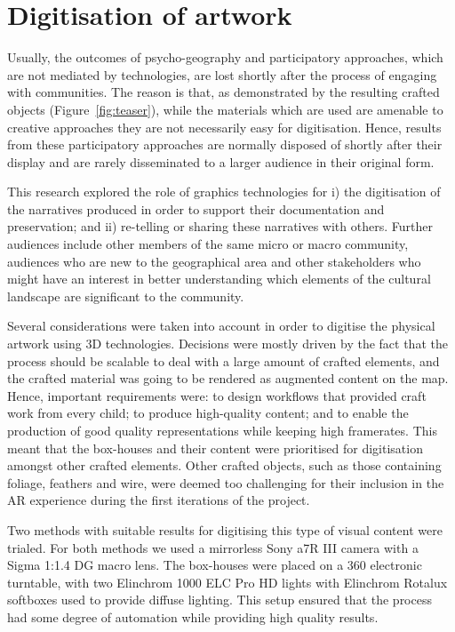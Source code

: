 \documentclass[acmlarge,screen,dvipsnames]{acmart}
\begin{document}
\section{Digitisation of artwork} 
\label{dig} 
Usually, the
outcomes of psycho-geography and participatory approaches, which are not
mediated by technologies, are lost shortly after the process of engaging with
communities. The reason is that, as demonstrated by the resulting crafted
objects (Figure~\ref{fig:teaser}), while the materials which are used  are
amenable to creative approaches they are not necessarily easy for
digitisation. Hence, results from these participatory approaches are normally
disposed of shortly after their display and are rarely disseminated to
 a larger audience in their original form. 

This research explored the role of graphics technologies for i) the
digitisation of the narratives produced in order to support their
documentation and preservation; and ii) re-telling or sharing these narratives with others.
Further audiences include other members of the same micro or macro community, audiences who are
new to the geographical area and other stakeholders who might have an interest
in better understanding which elements of the cultural landscape are
significant to the community.

Several considerations were taken into  account in order to digitise the
physical artwork using 3D technologies. Decisions were mostly driven by
the fact that the process should be scalable to deal with a large amount of
crafted elements, and the crafted material was going to be rendered
as augmented content on the map. Hence, important requirements were: to
design workflows that provided craft work from every child; to produce
high-quality content; and to enable the production of good quality
representations while keeping high framerates. This meant that
the box-houses and their content were prioritised for digitisation
amongst other crafted elements. Other crafted objects, such as those
containing foliage, feathers and wire, were deemed too challenging  for
their inclusion in the AR experience during the first iterations of the
project.

Two methods with suitable results for digitising this type of visual content were trialed. For both methods we used a mirrorless Sony a7R III camera with a Sigma 1:1.4 DG
macro lens. The box-houses were placed on a 360 electronic turntable, with two
Elinchrom 1000 ELC Pro HD lights with Elinchrom Rotalux softboxes used to
provide diffuse lighting. This setup ensured that the process had some degree of automation while providing
high quality results.
\end{document}
